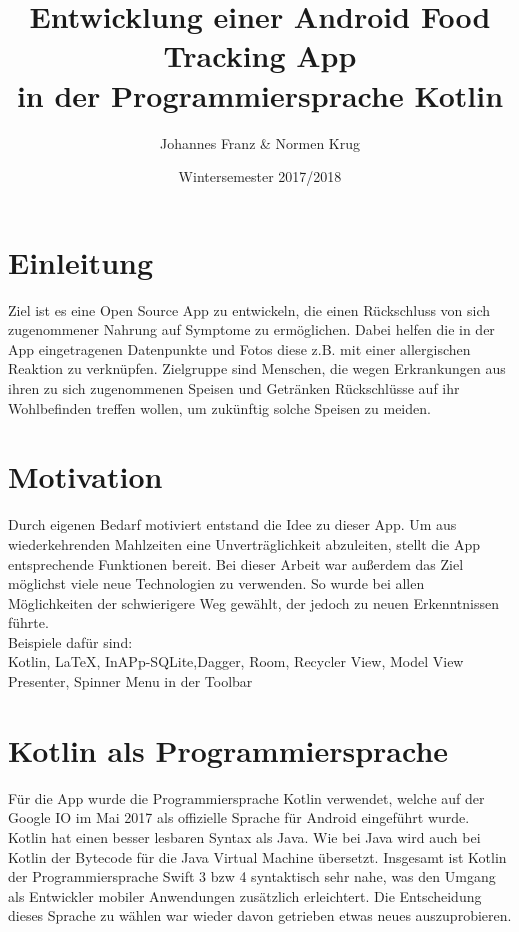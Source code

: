 \documentclass[
    DIV12,
    cleardouble=plain,
    headings=normal,
    pdftex,
    headexclude,footexclude,
    final
]{scrreprt}
\title{
  Entwicklung einer Android Food Tracking App \\[1em]
  in der Programmiersprache Kotlin  
}
\author{Johannes Franz \& Normen Krug}
\date{Wintersemester 2017/2018}
\begin{document}
\maketitle



\tableofcontents


\newpage
{}


\chapter{Einleitung}
Ziel ist es eine Open Source App zu entwickeln, die einen Rückschluss von sich zugenommener Nahrung auf Symptome zu ermöglichen. Dabei helfen die in der App eingetragenen Datenpunkte und Fotos diese z.B. mit einer allergischen Reaktion zu verknüpfen.
Zielgruppe sind Menschen, die wegen Erkrankungen aus ihren zu sich zugenommenen Speisen und Getränken Rückschlüsse auf ihr Wohlbefinden treffen wollen, um zukünftig solche Speisen zu meiden.


\newpage

\chapter{Motivation}
Durch eigenen Bedarf motiviert entstand die Idee zu dieser App. Um aus wiederkehrenden Mahlzeiten eine Unverträglichkeit abzuleiten, stellt die App entsprechende Funktionen bereit.
Bei dieser Arbeit war außerdem das Ziel möglichst viele neue Technologien zu verwenden. So wurde bei allen Möglichkeiten der schwierigere Weg gewählt, der jedoch zu neuen Erkenntnissen führte.\\
Beispiele dafür sind:\\
Kotlin, LaTeX, InAPp-SQLite,Dagger, Room, Recycler View, Model View Presenter, Spinner Menu in der Toolbar


\chapter{Kotlin als Programmiersprache}
Für die App wurde die Programmiersprache Kotlin verwendet, welche auf der Google IO im Mai 2017 als offizielle Sprache für Android eingeführt wurde. Kotlin hat einen besser lesbaren Syntax als Java. Wie bei Java wird auch bei Kotlin der Bytecode für die Java Virtual Machine übersetzt. Insgesamt ist Kotlin der Programmiersprache Swift 3 bzw 4 syntaktisch sehr nahe, was den Umgang als Entwickler mobiler Anwendungen zusätzlich erleichtert. Die Entscheidung dieses Sprache zu wählen war wieder davon getrieben etwas neues auszuprobieren.\\
\end{document}
